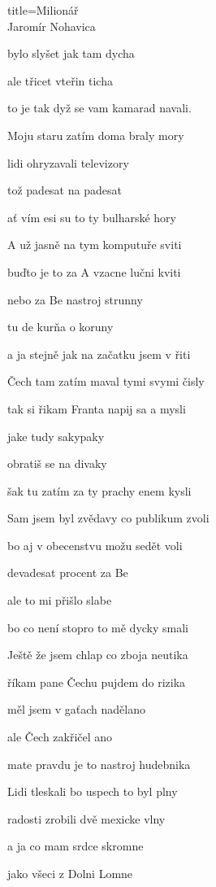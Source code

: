 \begin{song}{title=\centering Milionář \\\normalsize Jaromír Nohavica  \vspace*{-0.3cm}}
{\begin{minipage}[t]{0.48\textwidth}
bylo slyšet jak tam dycha 

ale třicet vteřin ticha 

to je tak dyž se vam kamarad navali.

\sloka
Moju staru zatím doma braly mory 

lidi ohryzavali televizory 

tož padesat na padesat 

ať vím esi su to ty bulharské hory

\end{minipage}\begin{minipage}[t]{0.48\textwidth}\setlength{\parindent}{0.45cm}\vspace*{0.59cm}  %


\sloka
A už jasně na tym komputuře sviti 

buďto je to za A vzacne lučni kviti 

nebo za Be nastroj strunny 

tu de kurňa o koruny 

a ja stejně jak na začatku jsem v řiti 

\sloka
Čech tam zatím maval tymi svymi čisly

tak si řikam Franta napij sa a mysli 

jake tudy sakypaky 

obratiš se na divaky

šak tu zatím za ty prachy enem kysli 

\sloka
Sam jsem byl zvědavy co publikum zvoli 

bo aj v obecenstvu možu sedět voli 

devadesat procent za Be 

ale to mi přišlo slabe 

bo co není stopro to mě dycky smali 

\sloka
Ještě že jsem chlap co zboja neutika 

říkam pane Čechu pujdem do rizika 

měl jsem v gaťach nadělano 

ale Čech zakřičel ano 

mate pravdu je to nastroj hudebnika

\sloka 
Lidi tleskali bo uspech to byl plny 

radosti zrobili dvě mexicke vlny 

a ja co mam srdce skromne 

jako všeci z Dolni Lomne 


\end{minipage}}
\end{song}
